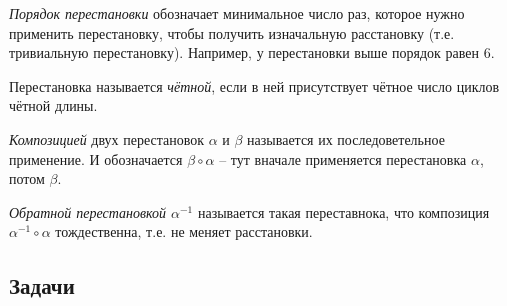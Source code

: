 \documentclass[10pt]{article}
\begin{document}
\begin{bullets}
\item \emph{Порядок перестановки} обозначает минимальное число раз, которое нужно применить перестановку, чтобы получить изначальную расстановку (т.е. тривиальную перестановку). Например, у перестановки выше порядок равен 6.

\item Перестановка называется \emph{чётной}, если в ней присутствует чётное число циклов чётной длины.

\item \emph{Композицией} двух перестановок $\alpha$ и $\beta$ называется их последоветельное применение. И обозначается $\beta \circ \alpha$ -- тут вначале применяется перестановка $\alpha$, потом $\beta$.

\item \emph{Обратной перестановкой $\alpha^{-1}$} называется такая переставнока, что композиция $\alpha^{-1} \circ \alpha$ тождественна, т.е. не меняет расстановки.

\end{bullets}

\subsection*{Задачи}

\end{document}
